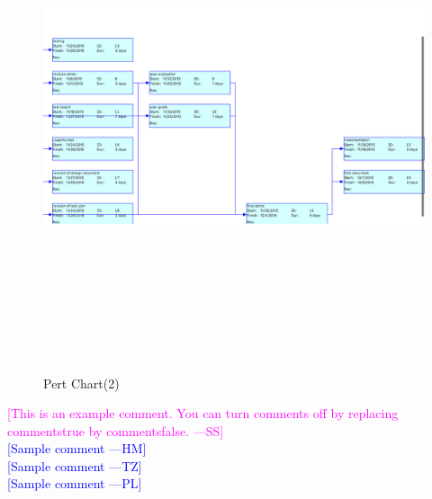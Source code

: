 \documentclass[titlepage]{article}
\newcommand{\authornote}[3]{\textcolor{#1}{[#3 ---#2]}}
\newcommand{\authornote}[3]{}
\newcommand{\wss}[1]{\authornote{magenta}{SS}{#1}}
\newcommand{\hm}[1]{\authornote{blue}{HM}{#1}} %
\newcommand{\tz}[1]{\authornote{blue}{TZ}{#1}} %
\newcommand{\pl}[1]{\authornote{blue}{PL}{#1}} %
\begin{document}
\begin{figure}
	\includegraphics[width=20cm, height=15cm]{pert2}
	\caption{Pert Chart(2)}
	\label{fig:Pert Chart(2)}
\end{figure}

\noindent \wss{This is an example comment.  You can turn comments off by replacing
  commentstrue by commentsfalse.}\\
\hm{Sample comment}\\
\tz{Sample comment}\\
\pl{Sample comment}
\end{document}
